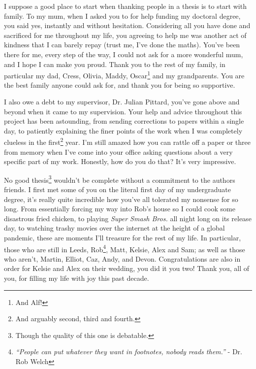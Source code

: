 

\begin{acknowledgements}      %

\setlength{\parindent}{17.62482pt}
\setlength{\parskip}{0.0pt plus 1.0pt}


I suppose a good place to start when thanking people in a thesis is to start with family.
To my mum, when I asked you to for help funding my doctoral degree, you said yes, instantly and without hesitation.
Considering all you have done and sacrificed for me throughout my life, you agreeing to help me was another act of kindness that I can barely repay (trust me, I've done the maths).
You've been there for me, every step of the way, I could not ask for a more wonderful mum, and I hope I can make you proud.
Thank you to the rest of my family, in particular my dad, Cress, Olivia, Maddy, Oscar\footnote{And Alf!} and my grandparents.
You are the best family anyone could ask for, and thank you for being so supportive.

I also owe a debt to my supervisor, Dr. Julian Pittard, you've gone above and beyond when it came to my supervision.
Your help and advice throughout this project has been astounding, from sending corrections to papers within a single day, to patiently explaining the finer points of the work when I was completely clueless in the first\footnote{And arguably second, third and fourth.} year.
I'm still amazed how you can rattle off a paper or three from memory when I've come into your office asking questions about a very specific part of my work.
Honestly, how do you do that? It's very impressive.

No good thesis\footnote{Though the quality of this one is debatable.} wouldn't be complete without a commitment to the authors friends.
I first met some of you on the literal first day of my undergraduate degree, it's really quite incredible how you've all tolerated my nonsense for so long.
From essentially forcing my way into Rob's house so I could cook some disastrous fried chicken, to playing \textit{Super Smash Bros.} all night long on its release day, to watching trashy movies over the internet at the height of a global pandemic, these are moments I'll treasure for the rest of my life.
In particular, those who are still in Leeds, Rob\footnote{\emph{``People can put whatever they want in footnotes, nobody reads them.''} - Dr. Rob Welch}, Matt, Kelsie, Alex and Sam; as well as those who aren't, Martin, Elliot, Caz, Andy, and Devon.
Congratulations are also in order for Kelsie and Alex on their wedding, you did it you two!
Thank you, all of you, for filling my life with joy this past decade.


\end{acknowledgements}
